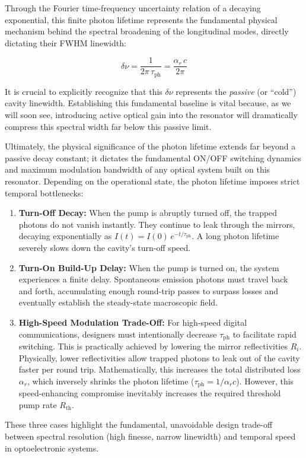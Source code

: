 Through the Fourier time-frequency uncertainty relation of a decaying exponential, this finite photon lifetime represents the fundamental physical mechanism behind the spectral broadening of the longitudinal modes, directly dictating their FWHM linewidth:
\begin{keyresult}
    \begin{equation}
        \delta\nu = \frac{1}{2\pi\,\tau_{\text{ph}}} = \frac{\alpha_r\,c}{2\pi}
    \end{equation}
\end{keyresult}

It is crucial to explicitly recognize that this $\delta\nu$ represents the \textit{passive} (or ``cold'') cavity linewidth. Establishing this fundamental baseline is vital because, as we will soon see, introducing active optical gain into the resonator will dramatically compress this spectral width far below this passive limit.

Ultimately, the physical significance of the photon lifetime extends far beyond a passive decay constant; it dictates the fundamental ON/OFF switching dynamics and maximum modulation bandwidth of any optical system built on this resonator. Depending on the operational state, the photon lifetime imposes strict temporal bottlenecks:
\begin{enumerate}
    \item \textbf{Turn-Off Decay:} When the pump is abruptly turned off, the trapped photons do not vanish instantly. They continue to leak through the mirrors, decaying exponentially as $I(t) = I(0)\,e^{-t/\tau_{\text{ph}}}$. A long photon lifetime severely slows down the cavity's turn-off speed.
    \item \textbf{Turn-On Build-Up Delay:} When the pump is turned on, the system experiences a finite delay. Spontaneous emission photons must travel back and forth, accumulating enough round-trip passes to surpass losses and eventually establish the steady-state macroscopic field.
    \item \textbf{High-Speed Modulation Trade-Off:} For high-speed digital communications, designers must intentionally decrease $\tau_{\text{ph}}$ to facilitate rapid switching. This is practically achieved by lowering the mirror reflectivities $R_i$. Physically, lower reflectivities allow trapped photons to leak out of the cavity faster per round trip. Mathematically, this increases the total distributed loss $\alpha_r$, which inversely shrinks the photon lifetime ($\tau_{\text{ph}} = 1/\alpha_r c$). However, this speed-enhancing compromise inevitably increases the required threshold pump rate $R_{\text{th}}$.
\end{enumerate}
These three cases highlight the fundamental, unavoidable design trade-off between spectral resolution (high finesse, narrow linewidth) and temporal speed in optoelectronic systems.

